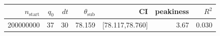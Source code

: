 \begin{tabular}{r r r r r r r}
\hline
$n_{\mathrm{start}}$ & $q_0$ & $dt$ & $\theta_{\mathrm{sub}}$ & CI & peakiness & $R^2$ \\
\hline
200000000 & 37 & 30 & 78.159 & [78.117,78.760] & 3.67 & 0.030 \\
\hline
\end{tabular}
